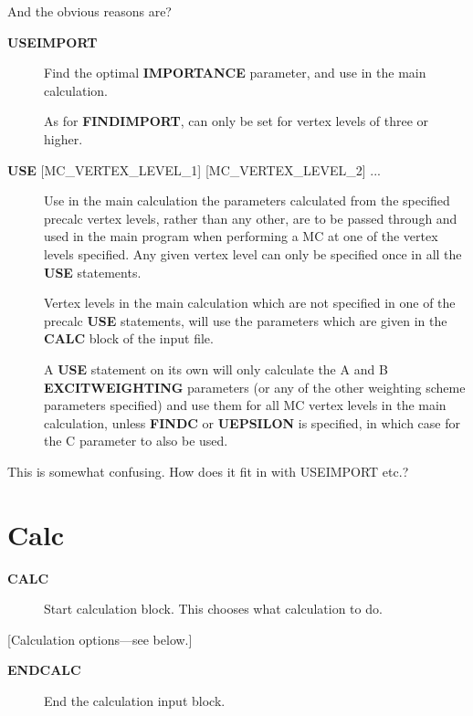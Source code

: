 \documentclass[openany,a4paper,10pt]{manual}
\begin{document}
\begin{notice}[note]
And the obvious reasons are?
\end{notice}
\begin{description}
\item[\textbf{USEIMPORT}]
Find the optimal \textbf{IMPORTANCE} parameter, and use in the main
calculation.

As for \textbf{FINDIMPORT}, can only be set for vertex levels of three
or higher.

\item[\textbf{USE} {[}MC\_VERTEX\_LEVEL\_1{]} {[}MC\_VERTEX\_LEVEL\_2{]} ...]
Use in the main calculation the parameters calculated from the specified precalc
vertex levels, rather than any other, are to be passed through and
used in the main program when performing a MC at one of the vertex
levels specified. Any given vertex level can only be specified once
in all the \textbf{USE} statements.

Vertex levels in the main calculation which are not specified in one of
the precalc \textbf{USE} statements, will
use the parameters which are given in the \textbf{CALC} block of
the input file.

A \textbf{USE} statement on its own will only calculate the
A and B \textbf{EXCITWEIGHTING} parameters (or any of the other weighting
scheme parameters specified) and use them for all MC vertex levels
in the main calculation, unless \textbf{FINDC} or \textbf{UEPSILON} is specified,
in which case for the C parameter to also be used.

\end{description}

\begin{notice}[note]
This is somewhat confusing.  How does it fit in with USEIMPORT etc.?
\end{notice}

\resetcurrentobjects


\hypertarget{input-calc}{}\section{Calc}
\begin{description}
\item[\textbf{CALC}]
Start calculation block.  This chooses what calculation to do.

\end{description}

{[}Calculation options---see below.{]}
\begin{description}
\item[\textbf{ENDCALC}]
End the calculation input block.

\end{description}
\end{document}
